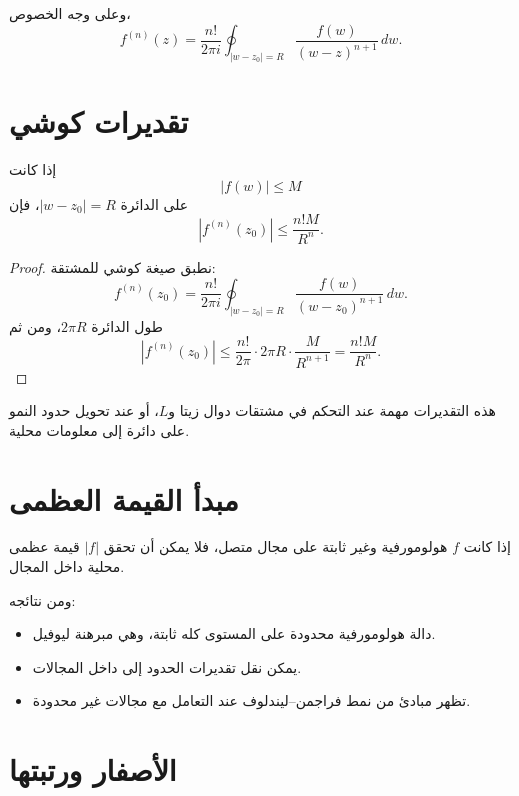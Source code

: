 وعلى وجه الخصوص،
\[
f^{(n)}(z)
=
\frac{n!}{2\pi i}
\oint_{|w-z_0|=R}
\frac{f(w)}{(w-z)^{n+1}}\,dw.
\]

\section{تقديرات كوشي}

\begin{theorem}
\label{thm:cauchy-estimates}
\provedhere
إذا كانت
\[
|f(w)|\leq M
\]
على الدائرة \(|w-z_0|=R\)، فإن
\[
|f^{(n)}(z_0)|
\leq
\frac{n!M}{R^n}.
\]
\end{theorem}

\begin{proof}
نطبق صيغة كوشي للمشتقة:
\[
f^{(n)}(z_0)
=
\frac{n!}{2\pi i}
\oint_{|w-z_0|=R}
\frac{f(w)}{(w-z_0)^{n+1}}\,dw.
\]
طول الدائرة \(2\pi R\)، ومن ثم
\[
|f^{(n)}(z_0)|
\leq
\frac{n!}{2\pi}
\cdot 2\pi R
\cdot \frac{M}{R^{n+1}}
=
\frac{n!M}{R^n}.
\]
\end{proof}

هذه التقديرات مهمة عند التحكم في مشتقات دوال زيتا و\(L\)، أو عند تحويل حدود النمو على دائرة إلى معلومات محلية.

\section{مبدأ القيمة العظمى}

\begin{theorem}
\label{thm:maximum-modulus}
إذا كانت \(f\) هولومورفية وغير ثابتة على مجال متصل، فلا يمكن أن تحقق \(|f|\) قيمة عظمى محلية داخل المجال.
\end{theorem}

ومن نتائجه:

\begin{itemize}
  \item دالة هولومورفية محدودة على المستوى كله ثابتة، وهي مبرهنة ليوفيل.
  \item يمكن نقل تقديرات الحدود إلى داخل المجالات.
  \item تظهر مبادئ من نمط فراجمن--ليندلوف عند التعامل مع مجالات غير محدودة.
\end{itemize}

\section{الأصفار ورتبتها}


